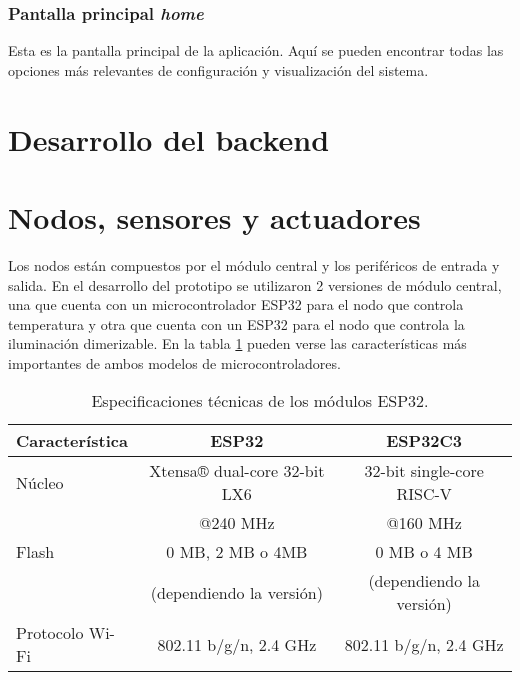 \subsubsection{Pantalla principal \textit{home}}

Esta es la pantalla principal de la aplicación. Aquí se pueden encontrar todas las opciones más relevantes de configuración y visualización del sistema.

\section{Desarrollo del backend}



\section{Nodos, sensores y actuadores}

Los nodos están compuestos por el módulo central y los periféricos de entrada y salida. En el desarrollo del prototipo se utilizaron 2 versiones de módulo central, una que cuenta con un microcontrolador ESP32 para el nodo que controla temperatura y otra que cuenta con un ESP32 para el nodo que controla la iluminación dimerizable. En la tabla \ref{tab:esp32} pueden verse las características más importantes de ambos modelos de microcontroladores.

\begin{table}[h]
\centering
\caption[Módulos ESP32]{Especificaciones técnicas de los módulos ESP32.}
\begin{tabular}{l c c}
\toprule
\textbf{Característica} & \textbf{ESP32} & \textbf{ESP32C3}\\
\midrule
Núcleo			& Xtensa® dual-core 32-bit LX6 	& 32-bit single-core RISC-V \\
				& @240 MHz						& @160 MHz \\
Flash			& 0 MB, 2 MB o 4MB				& 0 MB o 4 MB \\
				& (dependiendo la versión)		& (dependiendo la versión) \\
Protocolo Wi-Fi	& 802.11 b/g/n, 2.4 GHz			& 802.11 b/g/n, 2.4 GHz \\
\bottomrule
\hline
\end{tabular}
\label{tab:esp32}
\end{table}

